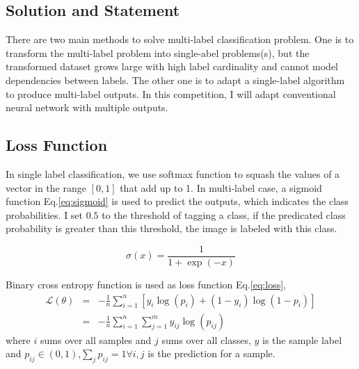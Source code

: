 \documentclass[11pt,oneside,a4paper]{article}
\begin{document}
\begin{multicols}{2}

  
\section{Solution and Statement}
\label{S:4}
There are two main methods to solve multi-label classification problem. One is to transform the multi-label problem into single-abel problems(s), but the transformed dataset grows large with high label cardinality and cannot model dependencies between labels. The other one is to adapt a single-label algorithm to produce multi-label outputs. In this competition, I will adapt conventional neural network with multiple outputs.

\subsection{Loss Function}
In single label classification, we use softmax function to squash the values of a vector in the range $[0,1]$ that add up to 1. In multi-label case, a sigmoid function Eq.\ref{eq:sigmoid} is used to predict the outputs, which indicates the class probabilities. I set $0.5$ to the threshold of tagging a class, if the predicated class probability is greater than this threshold, the image is labeled with this class.

\begin{equation}
\sigma(x) = \frac{1}{1 + \exp{(-x)}} \label{eq:sigmoid}
\end{equation}

Binary cross entropy function is used as loss function Eq.\ref{eq:loss},
\begin{eqnarray}
\mathcal{L}(\theta) & = &  
-\frac{1}{n}\sum^{n}_{i=1}\left[y_i \log(p_i) + (1-y_i)\log(1-p_i)\right] \nonumber \\
& = & -\frac{1}{n}\sum^{n}_{i=1}\sum^{m}_{j=1}y_{ij}\log(p_{ij}) \label{eq:loss}
\end{eqnarray}
where $i$ sums over all samples and $j$ sums over all classes, $y$ is the sample label and $p_{ij}\in(0,1)$,$\sum_{j} p_{ij} = 1 \forall i, j$ is the prediction for a sample.


\end{multicols}
\end{document}
